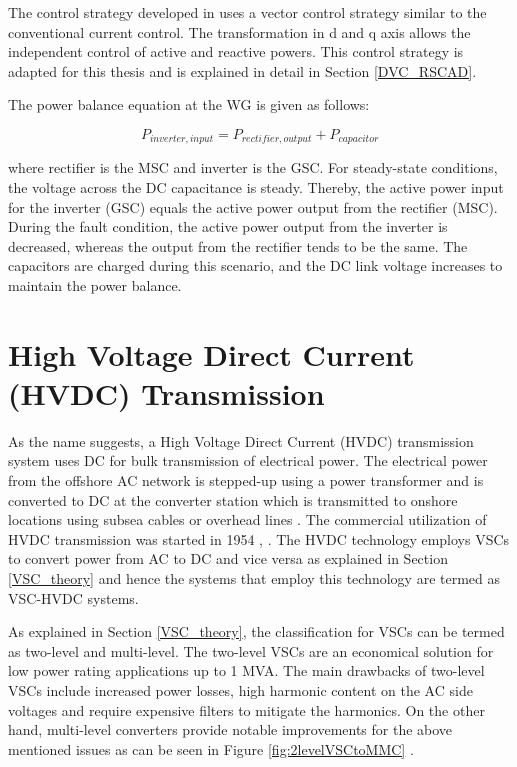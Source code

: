 The control strategy developed in \cite{korai_dynamic_2019} uses a vector control strategy similar to the conventional current control. The transformation in d and q axis allows the independent control of active and reactive powers. This control strategy is adapted for this thesis and is explained in detail in Section \ref{DVC_RSCAD}. 

The power balance equation at the \gls{WG} is given as follows:

\begin{equation}\label{powbaleq}
    P_{inverter,input} = P_{rectifier,output} + P_{capacitor}  
\end{equation}

where rectifier is the \gls{MSC} and inverter is the \gls{GSC}. For steady-state conditions, the voltage across the \gls{DC} capacitance is steady. Thereby, the active power input for the inverter (\gls{GSC}) equals the active power output from the rectifier (\gls{MSC}). During the fault condition, the active power output from the inverter is decreased, whereas the output from the rectifier tends to be the same. The capacitors are charged during this scenario, and the \gls{DC} link voltage increases to maintain the power balance. 

\section{High Voltage Direct Current (HVDC) Transmission}\label{HVDC_trans_theory}
As the name suggests, a High Voltage Direct Current (\gls{HVDC}) transmission system uses \gls{DC} for bulk transmission of electrical power. The electrical power from the offshore \gls{AC} network is stepped-up using a power transformer and is converted to \gls{DC} at the converter station which is transmitted to onshore locations using subsea cables or overhead lines \cite{abbreviewnew}. The commercial utilization of \gls{HVDC} transmission was started in 1954 \cite{cigre2005b4}, \cite{peake_history_2010}. The \gls{HVDC} technology employs \gls{VSC}s to convert power from \gls{AC} to \gls{DC} and vice versa as explained in Section \ref{VSC_theory} and hence the systems that employ this technology are termed as \gls{VSC}-\gls{HVDC} systems.

As explained in Section \ref{VSC_theory}, the classification for \gls{VSC}s can be termed as two-level and multi-level. The two-level \gls{VSC}s are an economical solution for low power rating applications up to 1 MVA. The main drawbacks of two-level \gls{VSC}s include increased power losses, high harmonic content on the \gls{AC} side voltages and require expensive filters to mitigate the harmonics. On the other hand, multi-level converters provide notable improvements for the above mentioned issues as can be seen in Figure \ref{fig:2levelVSCtoMMC} \cite{sharifabadi2016design}.   

